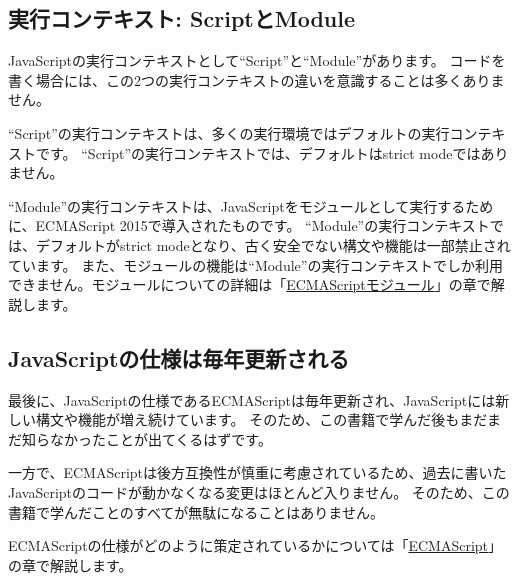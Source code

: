 \hypertarget{script-module}{%
\subsection{実行コンテキスト: ScriptとModule}\label{script-module}}

JavaScriptの実行コンテキストとして``Script''と``Module''があります。
コードを書く場合には、この2つの実行コンテキストの違いを意識することは多くありません。

``Script''の実行コンテキストは、多くの実行環境ではデフォルトの実行コンテキストです。
``Script''の実行コンテキストでは、デフォルトはstrict
modeではありません。

``Module''の実行コンテキストは、JavaScriptをモジュールとして実行するために、ECMAScript
2015で導入されたものです。
``Module''の実行コンテキストでは、デフォルトがstrict
modeとなり、古く安全でない構文や機能は一部禁止されています。
また、モジュールの機能は``Module''の実行コンテキストでしか利用できません。モジュールについての詳細は「\hyperlink{module}{ECMAScriptモジュール}」の章で解説します。

\hypertarget{ecmascript-updates}{%
\subsection{JavaScriptの仕様は毎年更新される}\label{ecmascript-updates}}

最後に、JavaScriptの仕様であるECMAScriptは毎年更新され、JavaScriptには新しい構文や機能が増え続けています。
そのため、この書籍で学んだ後もまだまだ知らなかったことが出てくるはずです。

一方で、ECMAScriptは後方互換性が慎重に考慮されているため、過去に書いたJavaScriptのコードが動かなくなる変更はほとんど入りません。
そのため、この書籍で学んだことのすべてが無駄になることはありません。

ECMAScriptの仕様がどのように策定されているかについては「\hyperlink{ecmascript}{ECMAScript}」の章で解説します。
